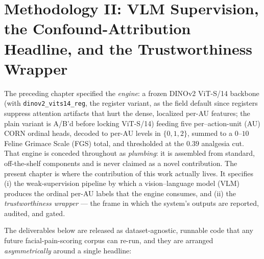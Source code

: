 \chapter{Methodology II: VLM Supervision, the Confound-Attribution Headline, and the Trustworthiness Wrapper}
\label{ch:vlm-wrapper}

The preceding chapter specified the \emph{engine}: a frozen DINOv2 ViT-S/14
backbone (with \texttt{dinov2\_vits14\_reg}, the register variant, as the field default since registers suppress attention artifacts that hurt the dense, localized per-AU features; the plain variant is A/B'd before locking ViT-S/14) feeding five per--action-unit (AU) CORN ordinal heads, decoded to
per-AU levels in $\{0,1,2\}$, summed to a $0$--$10$ Feline Grimace Scale (FGS)
total, and thresholded at the $0.39$ analgesia cut. That engine is conceded
throughout as \emph{plumbing}: it is assembled from standard, off-the-shelf
components and is never claimed as a novel contribution. The present chapter is
where the contribution of this work actually lives. It specifies (i) the
weak-supervision pipeline by which a vision--language model (VLM) produces the
ordinal per-AU labels that the engine consumes, and (ii) the
\emph{trustworthiness wrapper} --- the frame in which the system's outputs are
reported, audited, and gated.

The deliverables below are released as dataset-agnostic, runnable code that any
future facial-pain-scoring corpus can re-run, and they are arranged
\emph{asymmetrically} around a single headline:

